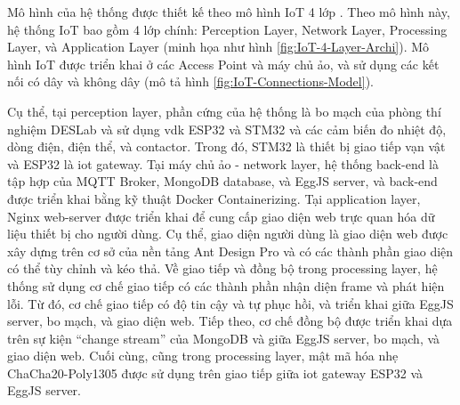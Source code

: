 Mô hình của hệ thống được thiết kế theo mô hình IoT 4 lớp \cite{IoT-4-Layer-Archi}. Theo mô hình này, hệ thống IoT bao gồm 4 lớp chính: Perception Layer, Network Layer, Processing Layer, và Application Layer (minh họa như hình \ref{fig:IoT-4-Layer-Archi}). Mô hình IoT được triển khai ở các Access Point và máy chủ ảo, và sử dụng các kết nối có dây và không dây (mô tả hình \ref{fig:IoT-Connections-Model}).

Cụ thể, tại perception layer, phần cứng của hệ thống là bo mạch của phòng thí nghiệm DESLab và sử dụng \acrshort{vdk} ESP32 và STM32 và các cảm biến đo nhiệt độ, dòng điện, điện thể, và contactor. Trong đó, STM32 là thiết bị giao tiếp vạn vật và ESP32 là \acrshort{iot} gateway.
% 
Tại máy chủ ảo - network layer, hệ thống back-end là tập hợp của MQTT Broker, MongoDB database, và EggJS server, và back-end được triển khai bằng kỹ thuật Docker Containerizing. Tại application layer, Nginx web-server được triển khai để cung cấp giao diện web trực quan hóa dữ liệu thiết bị cho người dùng.
%
Cụ thể, giao diện người dùng là giao diện web được xây dựng trên cơ sở của nền tảng Ant Design Pro và có các thành phần giao diện có thể tùy chỉnh và kéo thả.
%
Về giao tiếp và đồng bộ trong processing layer, hệ thống sử dụng cơ chế giao tiếp có các thành phần nhận diện frame và phát hiện lỗi. Từ đó, cơ chế giao tiếp có độ tin cậy và tự phục hồi, và triển khai giữa EggJS server, bo mạch, và giao diện web.
%
Tiếp theo, cơ chế đồng bộ được triển khai dựa trên sự kiện ``change stream'' của MongoDB và giữa EggJS server, bo mạch, và giao diện web.
%
Cuối cùng, cũng trong processing layer, mật mã hóa nhẹ ChaCha20-Poly1305 được sử dụng trên giao tiếp giữa \acrshort{iot} gateway ESP32 và EggJS server.

